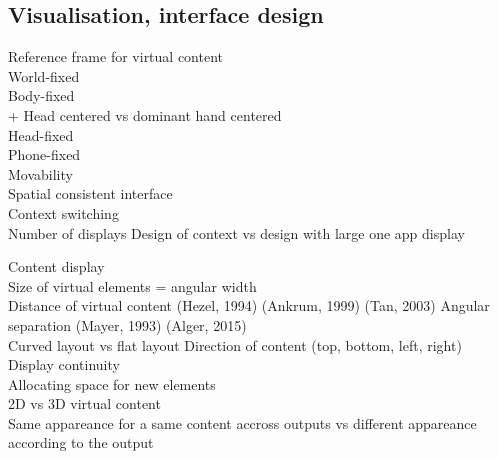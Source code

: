 \subsection{Visualisation, interface design}
        Reference frame for virtual content\\
            World-fixed \cite{EnsFinneganIrani2014}\\
            Body-fixed \cite{EnsFinneganIrani2014}\\
                + Head centered vs dominant hand centered\\
            Head-fixed \cite{EnsFinneganIrani2014}\\
            Phone-fixed\\
          Movability \cite{EnsHincapie-RamosIrani2014}\\
            Spatial consistent interface \cite{LiDearmanTruong2009}\\

        Context switching\\
            Number of displays \cite{RashidNacentaQuigley2012} \cite{CauchardLoechtefeldFraserEtAl2012}
            Design of context vs design with large one app display \cite{BallNorth2008}

        Content display\\
            Size of virtual elements = angular width \cite{ShuppBallYostEtAl2006} \cite{BallNorth2008}\\
            Distance of virtual content (Hezel, 1994) (Ankrum, 1999) (Tan, 2003) \cite{ChanKaoChenEtAl2010} \cite{EnsFinneganIrani2014} 
            Angular separation (Mayer, 1993) \cite{EnsFinneganIrani2014} \cite{KishishitaKiyokawaOrloskyEtAl2014} (Alger, 2015)\\ 
            Curved layout vs flat layout \cite{ShuppBallYostEtAl2006} 
            Direction of content (top, bottom, left, right) \cite{EnsFinneganIrani2014}\\
            Display continuity \cite{TanCzerwinski2003} \cite{RashidNacentaQuigley2012}\\
            Allocating space for new elements \cite{BellFeiner2000}\\

            2D vs 3D virtual content \cite{JansenDragicevicFekete2013} \cite{SerranoHildebrandtSubramanianEtAl2014}\\
            Same appareance for a same content accross outputs vs different appareance according to the output \cite{GrubertHeinischQuigleyEtAl2015}\\


